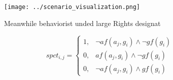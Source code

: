 \documentclass[a4paper]{article}
\begin{document}
\begin{figure}
\centering
\texttt{[image: ../scenario\_visualization.png]}
\caption{Meanwhile behaviorist unded large Rights designat
}
\end{figure}
 
\begin{equation}
spct_{i,j} =
\begin{cases}
1, & \text{$\neg af(a_j,g_i) \wedge \neg gf(g_i)$}\\
0, & \text{$af(a_j,g_i) \wedge \neg gf(g_i)$}\\
0, & \text{$\neg af(a_j,g_i) \wedge gf(g_i)$}
\end{cases}
\end{equation}
\end{document}
